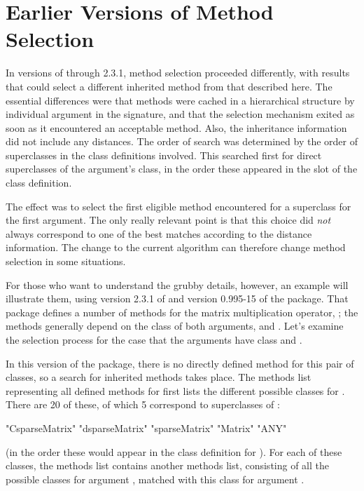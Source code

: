 \documentclass[11pt]{article}
\begin{document}
\section{Earlier Versions of Method Selection}
\label{sec:earl-meth-select}

In versions of \R{} through 2.3.1, method selection proceeded differently, with results that could select a different inherited method from that described here.
The essential differences were that methods were cached in a hierarchical structure by individual argument in the signature, and that the selection mechanism exited as soon as it encountered an acceptable method.
Also, the inheritance information did not include any distances.
The order of search was determined by the order of superclasses in the class definitions involved.
This searched first for direct superclasses of the argument's class, in the order these appeared in the   slot of the class definition.

The effect was to select the first eligible method encountered for a superclass for the first argument.
The only really relevant point is that this choice did \emph{not}  always correspond to one of the best matches according to the distance information.
The change to the current algorithm can therefore change method selection in some situations.

For those who want to understand the grubby details, however, an example will illustrate them, using version 2.3.1 of \R{} and version 0.995-15 of the  package.
That package defines a number of methods for the matrix multiplication operator, \SOperator{\%*\%}; the methods generally depend on the class of both arguments,  and .
Let's examine the selection process for the case that the arguments have class  and .

In this version of the package, there is no directly defined method for this pair of classes, so a search for inherited methods takes place.
The methods list representing all defined methods for \SOperator{\%*\%} first lists the different possible classes for .
There are 20 of these, of which 5 correspond to superclasses of :
\begin{Example}
[1] "CsparseMatrix" "dsparseMatrix" "sparseMatrix"  "Matrix" "ANY"
\end{Example}
(in the order these would appear in the class definition for ).
For each of these classes, the methods list contains another methods list, consisting of all the possible classes for argument , matched with this class for argument .
\end{document}
